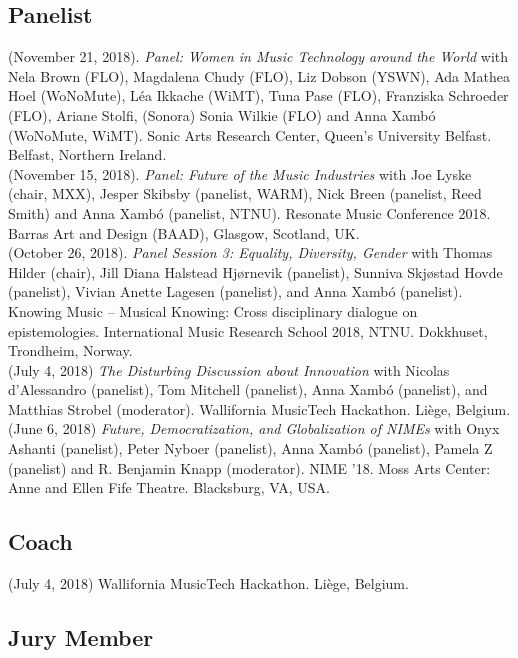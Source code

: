 \documentclass[10pt, a4paper]{article}
\newcommand{\years}[1]{\marginnote{\scriptsize #1}}
\begin{document}
\subsection*{Panelist}
\noindent
\years{2018e}(November 21, 2018). \emph{Panel: Women in Music Technology around the World} with Nela Brown (FLO), Magdalena Chudy (FLO), Liz Dobson (YSWN), Ada Mathea Hoel (WoNoMute), Léa Ikkache (WiMT), Tuna Pase (FLO), Franziska Schroeder (FLO), Ariane Stolfi, (Sonora) Sonia Wilkie (FLO) and Anna Xambó (WoNoMute, WiMT). Sonic Arts Research Center, Queen's University Belfast. Belfast, Northern Ireland.\\
\years{2018d}(November 15, 2018). \emph{Panel: Future of the Music Industries} with Joe Lyske (chair, MXX), Jesper Skibsby (panelist, WARM), Nick Breen (panelist, Reed Smith) and Anna Xambó (panelist, NTNU). Resonate Music Conference 2018. Barras Art and Design (BAAD), Glasgow, Scotland, UK.\\
\years{2018c}(October 26, 2018). \emph{Panel Session 3: Equality, Diversity, Gender} with Thomas Hilder (chair), Jill Diana Halstead Hjørnevik (panelist), Sunniva Skjøstad Hovde (panelist), Vivian Anette Lagesen (panelist), and Anna Xambó (panelist). Knowing Music -- Musical Knowing: Cross disciplinary dialogue on epistemologies. International Music Research School 2018, NTNU. Dokkhuset, Trondheim, Norway.\\
\years{2018b}(July 4, 2018) \emph{The Disturbing Discussion about Innovation} with Nicolas d'Alessandro (panelist), Tom Mitchell (panelist), Anna Xambó (panelist), and Matthias Strobel (moderator). Wallifornia MusicTech Hackathon. Liège, Belgium.\\
\years{2018a}(June 6, 2018) \emph{Future, Democratization, and Globalization of NIMEs} with Onyx Ashanti (panelist), Peter Nyboer (panelist), Anna Xambó (panelist), Pamela Z (panelist) and R. Benjamin Knapp (moderator). NIME '18. Moss Arts Center: Anne and Ellen Fife Theatre. Blacksburg, VA, USA.

\subsection*{Coach}
\noindent

\years{2018}(July 4, 2018) Wallifornia MusicTech Hackathon. Liège, Belgium.

\subsection*{Jury Member}
\noindent
\end{document}
